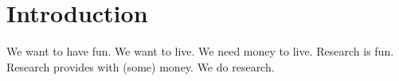 \section{Introduction}

We want to have fun. We want to live. We need money to live. Research is fun. Research provides with (some) money. We do research.

